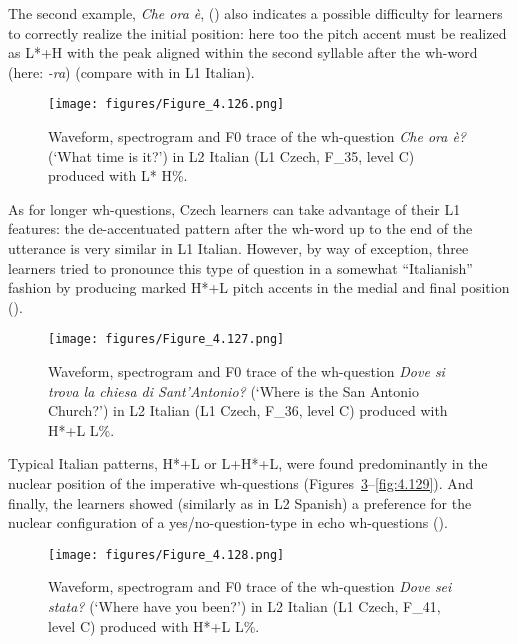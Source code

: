 The second example, \textit{Che ora è}, () also indicates a possible difficulty for learners to correctly realize the initial position: here too the pitch accent must be realized as L*+H with the peak aligned within the second syllable after the wh-word (here: \textit{{}-ra}) (compare with  in L1 Italian).

\begin{figure}
\texttt{[image: figures/Figure\_4.126.png]}
\caption{Waveform, spectrogram and F0 trace of the wh-question \textit{Che ora è?} (‘What time is it?’) in L2 Italian (L1 Czech, F\_35, level C) produced with L* H\%.}
\label{fig:4.126}
\end{figure}

As for longer wh-questions, Czech learners can take advantage of their L1 features: the de-accentuated pattern after the wh-word up to the end of the utterance is very similar in L1 Italian. However, by way of exception, three learners tried to pronounce this type of question in a somewhat “Italianish” fashion by producing marked H*+L pitch accents in the medial and final position ().

\begin{figure}
\texttt{[image: figures/Figure\_4.127.png]}
\caption{Waveform, spectrogram and F0 trace of the wh-question \textit{Dove si trova la chiesa di Sant’Antonio?} (‘Where is the San Antonio Church?’) in L2 Italian (L1 Czech, F\_36, level C) produced with H*+L L\%.}
\label{fig:4.127}
\end{figure}

Typical Italian patterns, H*+L or L+H*+L, were found predominantly in the nuclear position of the imperative wh-questions (Figures~\ref{fig:4.128}--\ref{fig:4.129}). And finally, the learners showed (similarly as in L2 Spanish) a preference for the nuclear configuration of a yes/no-question-type in echo wh-questions ().

\begin{figure}


\texttt{[image: figures/Figure\_4.128.png]}



\caption{Waveform, spectrogram and F0 trace of the wh-question \textit{Dove sei stata?} (‘Where have you been?’) in L2 Italian (L1 Czech, F\_41, level C) produced with H*+L L\%.}
\label{fig:4.128}
\end{figure}

